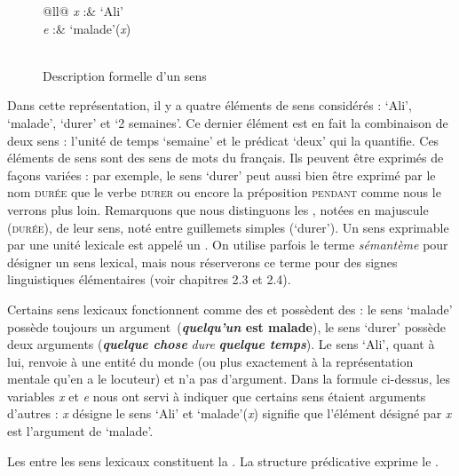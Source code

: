 \begin{figure}
\begin{tabular}{@{}ll@{}}
\textit{x} :& ‘Ali’\\
\textit{e} :& ‘malade’(\textit{x})\\
\\
\end{tabular}
\caption{\label{fig:}Description formelle d’un sens}
\end{figure}

Dans cette représentation, il y a quatre éléments de sens considérés : ‘Ali’, ‘malade’, ‘durer’ et ‘2 semaines’. Ce dernier élément est en fait la combinaison de deux sens : l’unité de temps ‘semaine’ et le prédicat ‘deux’ qui la quantifie. Ces éléments de sens sont des sens de mots du français. Ils peuvent être exprimés de façons variées : par exemple, le sens ‘durer’ peut aussi bien être exprimé par le nom \textsc{durée} que le verbe \textsc{durer} ou encore la préposition \textsc{pendant} comme nous le verrons plus loin. Remarquons que nous distinguons les , notées en majuscule (\textsc{durée}), de leur sens, noté entre guillemets simples (‘durer’). Un sens exprimable par une unité lexicale est appelé un . On utilise parfois le terme \textit{sémantème} pour désigner un sens lexical, mais nous réserverons ce terme pour des signes linguistiques élémentaires (voir chapitres 2.3 et 2.4).

Certains sens lexicaux fonctionnent comme des  et possèdent des  : le sens ‘malade’ possède toujours un argument~(\textbf{\textit{quelqu’un} est malade}), le sens ‘durer’ possède deux arguments (\textbf{\textit{quelque chose}} \textit{dure} \textbf{\textit{quelque temps}}). Le sens ‘Ali’, quant à lui, renvoie à une entité du monde (ou plus exactement à la représentation mentale qu’en a le locuteur) et n’a pas d’argument. Dans la formule ci-dessus, les variables \textit{x} et \textit{e} nous ont servi à indiquer que certains sens étaient arguments d’autres : \textit{x} désigne le sens ‘Ali’ et ‘malade’(\textit{x}) signifie que l’élément désigné par \textit{x} est l’argument de ‘malade’.

\begin{styleLivreImportant}
Les  entre les sens lexicaux constituent la . La structure prédicative exprime le .
\end{styleLivreImportant}

